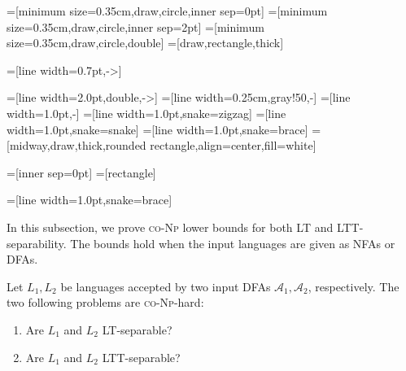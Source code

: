 \documentclass{LMCS}
\newcommand{\lt}{\textup{LT}\xspace}
\newcommand{\ltt}{\textup{LTT}\xspace}
\theoremstyle{plain}
\begin{document}
\makeatletter{}=[minimum size=0.35cm,draw,circle,inner sep=0pt]
=[minimum size=0.35cm,draw,circle,inner sep=2pt]
=[minimum size=0.35cm,draw,circle,double]
=[draw,rectangle,thick]

=[line width=0.7pt,->]

=[line width=2.0pt,double,->]
=[line width=0.25cm,gray!50,-]
=[line width=1.0pt,-]
=[line width=1.0pt,snake=zigzag]
=[line width=1.0pt,snake=snake]
=[line width=1.0pt,snake=brace]
=[midway,draw,thick,rounded rectangle,align=center,fill=white]

=[inner sep=0pt]
=[rectangle]

=[line width=1.0pt,snake=brace]


In this subsection, we prove \textsc{co-Np} lower bounds for both \lt and
\ltt-separability. The bounds hold when the input languages are given
as NFAs or DFAs.


\begin{prop} \label{prop:hard} Let $L_1,L_2$ be languages accepted by
  two input DFAs $\mathcal{A}_1,\mathcal{A}_2$, respectively. The two following problems
  are \textsc{co-Np}-hard:
  
  \begin{enumerate}
  \item\label{itm:lt} Are $L_1$ and $L_2$ \lt-separable?
  \item\label{itm:ltt} Are $L_1$ and $L_2$ \ltt-separable?
  \end{enumerate}
\end{prop}
\end{document}
